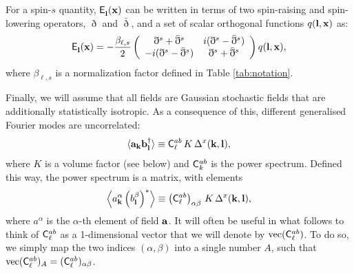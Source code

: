 \documentclass[a4paper,11pt]{article}
\newcommand{\Ylm}[3]{{\sf E}^{#1}_{\bf #2}({\bf #3})}
\begin{document}
      For a spin-$s$ quantity, $\Ylm{}{l}{x}$ can be written in terms of two spin-raising and spin-lowering operators, $\eth$ and $\bar{\eth}$, and a set of scalar orthogonal functions $q({\bf l},{\bf x})$ as:
      \begin{equation}
        \Ylm{}{l}{x}=-\frac{\beta_{\ell,s}}{2}\left(
        \begin{array}{cc}
          \eth^s+\bar{\eth}^s & i(\eth^s-\bar{\eth}^s)\\
          -i(\eth^s-\bar{\eth}^s) & \eth^s+\bar{\eth}^s
        \end{array}\right) q({\bf l},{\bf x}),
      \end{equation}
      where $\beta_{\ell,s}$ is a normalization factor defined in Table \ref{tab:notation}.
    
      Finally, we will assume that all fields are Gaussian stochastic fields that are additionally statistically isotropic. As a consequence of this, different generalised Fourier modes are uncorrelated:
      \begin{equation}\label{eq:iso}
        \langle {\bf a}_{\bf k}{\bf b}^\dag_{\bf l}\rangle\equiv {\sf C}^{ab}_\ell\,K\,\Delta^x({\bf k},{\bf l}),
      \end{equation}
      where $K$ is a volume factor (see below) and ${\sf C}^{ab}_k$ is the power spectrum. Defined this way, the power spectrum is a matrix, with elements
      \begin{equation}
        \left\langle a^\alpha_{\bf k}\left(b^\beta_{\bf l}\right)^*\right\rangle\equiv \left({\sf C}^{ab}_\ell\right)_{\alpha\beta}\,K\,\Delta^x({\bf k},{\bf l}),
      \end{equation}
      where $a^\alpha$ is the $\alpha$-th element of field ${\bf a}$. It will often be useful in what follows to think of ${\sf C}^{ab}_\ell$ as a 1-dimensional vector that we will denote by ${\rm vec}({\sf C}^{ab}_\ell)$. To do so, we simply map the two indices $(\alpha,\beta)$ into a single number $A$, such that ${\rm vec}({\sf C}^{ab}_\ell)_A = ({\sf C}^{ab}_\ell)_{\alpha\beta}$.
    
\end{document}
